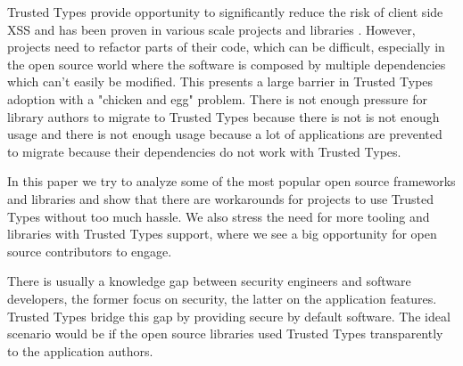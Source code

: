 Trusted Types provide opportunity to significantly reduce the risk of client side XSS and has been
proven in various scale projects and libraries \cite{tt_web_framework_paper}
\cite{tt_integration_list}. However, projects need to refactor parts of their code, which can be
difficult, especially in the open source world where the software is composed by multiple
dependencies which can't easily be modified. This presents a large barrier in Trusted Types adoption
\cite{tt_web_framework_paper} with a "chicken and egg" problem. There is not enough pressure for
library authors to migrate to Trusted Types because there is not is not enough usage and there is
not enough usage because a lot of applications are prevented to migrate because their dependencies
do not work with Trusted Types.

In this paper we try to analyze some of the most popular open source frameworks and libraries and
show that there are workarounds for projects to use Trusted Types without too much hassle. We
also stress the need for more tooling and libraries with Trusted Types support, where we see a big
opportunity for open source contributors to engage.

There is usually a knowledge gap between security engineers and software developers, the former
focus on security, the latter on the application features. Trusted Types bridge this gap by
providing secure by default software. The ideal scenario would be if the open source libraries used
Trusted Types transparently to the application authors.
